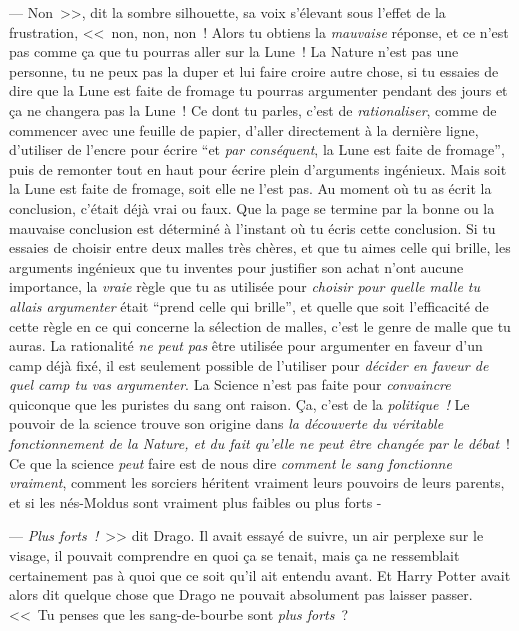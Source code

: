 --- Non~>>, dit la sombre silhouette, sa voix s'élevant sous l'effet de la frustration, <<~non, non, non~! Alors tu obtiens la \emph{mauvaise} réponse, et ce n'est pas comme ça que tu pourras aller sur la Lune~! La Nature n'est pas une personne, tu ne peux pas la duper et lui faire croire autre chose, si tu essaies de dire que la Lune est faite de fromage tu pourras argumenter pendant des jours et ça ne changera pas la Lune~! Ce dont tu parles, c'est de \emph{rationaliser}, comme de commencer avec une feuille de papier, d'aller directement à la dernière ligne, d'utiliser de l'encre pour écrire “et \emph{par conséquent}, la Lune est faite de fromage”, puis de remonter tout en haut pour écrire plein d'arguments ingénieux. Mais soit la Lune est faite de fromage, soit elle ne l'est pas. Au moment où tu as écrit la conclusion, c'était déjà vrai ou faux. Que la page se termine par la bonne ou la mauvaise conclusion est déterminé à l'instant où tu écris cette conclusion. Si tu essaies de choisir entre deux malles très chères, et que tu aimes celle qui brille, les arguments ingénieux que tu inventes pour justifier son achat n'ont aucune importance, la \emph{vraie} règle que tu as utilisée pour \emph{choisir pour quelle malle tu allais argumenter} était “prend celle qui brille”, et quelle que soit l'efficacité de cette règle en ce qui concerne la sélection de malles, c'est le genre de malle que tu auras. La rationalité \emph{ne peut pas} être utilisée pour argumenter en faveur d'un camp déjà fixé, il est seulement possible de l'utiliser pour \emph{décider en faveur de quel camp tu vas argumenter}. La Science n'est pas faite pour \emph{convaincre} quiconque que les puristes du sang ont raison. Ça, c'est de la \emph{politique~!} Le pouvoir de la science trouve son origine dans \emph{la découverte du véritable fonctionnement de la Nature, et du fait qu'elle ne peut être changée par le débat}~! Ce que la science \emph{peut} faire est de nous dire \emph{comment le sang fonctionne vraiment}, comment les sorciers héritent vraiment leurs pouvoirs de leurs parents, et si les nés-Moldus sont vraiment plus faibles ou plus forts -

--- \emph{Plus forts~!}~>> dit Drago. Il avait essayé de suivre, un air perplexe sur le visage, il pouvait comprendre en quoi ça se tenait, mais ça ne ressemblait certainement pas à quoi que ce soit qu'il ait entendu avant. Et Harry Potter avait alors dit quelque chose que Drago ne pouvait absolument pas laisser passer. <<~Tu penses que les sang-de-bourbe sont \emph{plus forts}~?

